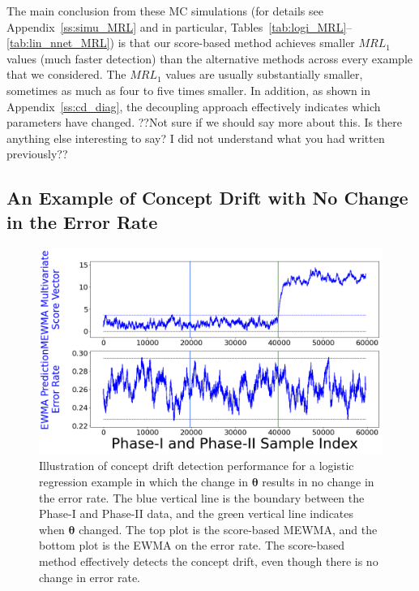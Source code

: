 \documentclass[twoside,11pt]{article}
\begin{document}
The main conclusion from these MC simulations (for details see Appendix~\ref{ss:simu_MRL} and in particular, Tables~\ref{tab:logi_MRL}--\ref{tab:lin_nnet_MRL}) is that our score-based method achieves smaller $MRL_1$ values (much faster detection) than the alternative methods across every example that we considered. The $MRL_1$ values are usually substantially smaller, sometimes as much as four to five times smaller. In addition, as shown in Appendix~\ref{ss:cd_diag}, the decoupling approach effectively indicates which parameters have changed. ??Not sure if we should say more about this. Is there anything else interesting to say? I did not understand what you had written previously??

\subsection{An Example of Concept Drift with No Change in the Error Rate}
\label{ss:cd_no_err_change}
\begin{figure}[!htp]
\centering
\includegraphics[width = \linewidth]{../figures/v14/sim_11/non_nnet_nonunif_ch_f_0_2/1_sim11_logi_1e-08_0_0015_1.png}
  \caption{Illustration of concept drift detection performance for a logistic regression example in which the change in $\bm{\theta}$ results in no change in the error rate. The blue vertical line is the boundary between the Phase-I and Phase-II data, and the green vertical line indicates when $\bm{\theta}$ changed. The top plot is the score-based MEWMA, and the bottom plot is the EWMA on the error rate. The score-based method effectively detects the concept drift, even though there is no change in error rate.}
  \label{fig:exp_no_err_ch}
\end{figure}
\end{document}
